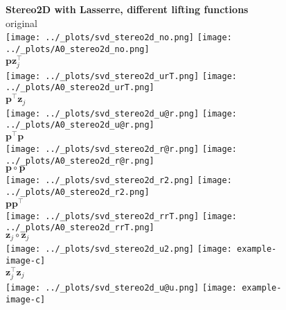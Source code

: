 \documentclass[11pt]{article}
\newcommand{\vc}[1]{\ensuremath{\bm{#1}}}
\begin{document}
\begin{figure}[h]
  \centering
  \textbf{\large{Stereo2D with Lasserre, different lifting functions}}\\
  original \\
  \texttt{[image: ../\_plots/svd\_stereo2d\_no.png]}
  \texttt{[image: ../\_plots/A0\_stereo2d\_no.png]} \\
  $\vc{p}\vc{z}_j^\top$ \\
  \texttt{[image: ../\_plots/svd\_stereo2d\_urT.png]}
  \texttt{[image: ../\_plots/A0\_stereo2d\_urT.png]} \\
  $\vc{p}^\top\vc{z}_j$ \\
  \texttt{[image: ../\_plots/svd\_stereo2d\_u@r.png]}
  \texttt{[image: ../\_plots/A0\_stereo2d\_u@r.png]} \\
  $\vc{p}^\top\vc{p}$ \\
  \texttt{[image: ../\_plots/svd\_stereo2d\_r@r.png]}
  \texttt{[image: ../\_plots/A0\_stereo2d\_r@r.png]} \\
  $\vc{p}\circ\vc{p}$ \\
  \texttt{[image: ../\_plots/svd\_stereo2d\_r2.png]}
  \texttt{[image: ../\_plots/A0\_stereo2d\_r2.png]}  \\
  $\vc{p}\vc{p}^\top$ \\
  \texttt{[image: ../\_plots/svd\_stereo2d\_rrT.png]}
  \texttt{[image: ../\_plots/A0\_stereo2d\_rrT.png]}  \\
  $\vc{z}_j\circ\vc{z}_j$ \\
  \texttt{[image: ../\_plots/svd\_stereo2d\_u2.png]} 
  \texttt{[image: example-image-c]}  \\
  $\vc{z}_j^\top\vc{z}_j$ \\
  \texttt{[image: ../\_plots/svd\_stereo2d\_u@u.png]}
  \texttt{[image: example-image-c]}  \\
\end{figure}
\end{document}
